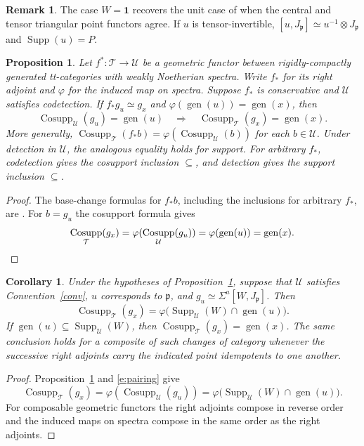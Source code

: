 \documentclass[11pt,reqno]{amsart}
\newtheorem{proposition}[theorem]{Proposition}
\newtheorem{corollary}[theorem]{Corollary}
\theoremstyle{definition}
\newtheorem{remark}[theorem]{Remark}
\DeclareMathOperator{\Cosupp}{Cosupp}
\DeclareMathOperator{\Supp}{Supp}
\DeclareMathOperator{\gen}{gen}
\newcommand{\T}{\mathcal T}
\newcommand{\U}{\mathcal U}
\newcommand{\one}{\mathbf 1}
\newcommand{\p}{\mathfrak p}
\numberwithin{equation}{section}
\begin{document}
\begin{remark}
The case $W=\one$ recovers the unit case of \cite[Proposition~5.4]{bik} when the central and tensor triangular point functors agree. If $u$ is tensor-invertible, $[u,J_{\p}]\simeq u^{-1}\otimes J_{\p}$ and $\Supp(u)=P$.
\end{remark}

\begin{proposition}\label{p:transport}
Let $f^*:\T\to\U$ be a geometric functor between rigidly-compactly generated tt-categories with weakly Noetherian spectra. Write $f_*$ for its right adjoint and $\varphi$ for the induced map on spectra. Suppose $f_*$ is conservative and $\U$ satisfies codetection. If $f_*g_u\simeq g_x$ and $\varphi(\gen(u))=\gen(x)$, then
\[
 \Cosupp_{\U}(g_u)=\gen(u)\quad\Longrightarrow\quad
 \Cosupp_{\T}(g_x)=\gen(x).
\]
More generally, $\Cosupp_{\T}(f_*b)=\varphi(\Cosupp_{\U}(b))$ for each $b\in\U$. Under detection in $\U$, the analogous equality holds for support. For arbitrary $f_*$, codetection gives the cosupport inclusion $\subseteq$, and detection gives the support inclusion $\subseteq$.
\end{proposition}
\begin{proof}
The base-change formulas for $f_*b$, including the inclusions for arbitrary $f_*$, are \cite[Proposition~14.2]{bchs}. For $b=g_u$ the cosupport formula gives
\[
 \Cosupp_{\T}(g_x)=\varphi(\Cosupp_{\U}(g_u))
                =\varphi(\gen(u))=\gen(x).\qedhere
\]
\end{proof}


\begin{corollary}\label{c:model}
Under the hypotheses of Proposition~\ref{p:transport}, suppose that $\U$ satisfies Convention~\ref{conv}, $u$ corresponds to $\p$, and $g_u\simeq\Sigma^a[W,J_{\p}]$. Then
\[
 \Cosupp_{\T}(g_x)
   =\varphi\big(\Supp_{\U}(W)\cap\gen(u)\big).
\]
If $\gen(u)\subseteq\Supp_{\U}(W)$, then $\Cosupp_{\T}(g_x)=\gen(x)$. The same conclusion holds for a composite of such changes of category whenever the successive right adjoints carry the indicated point idempotents to one another.
\end{corollary}
\begin{proof}
Proposition~\ref{p:transport} and \eqref{e:pairing} give
\[
 \Cosupp_{\T}(g_x)=\varphi(\Cosupp_{\U}(g_u))
 =\varphi\big(\Supp_{\U}(W)\cap\gen(u)\big).
\]
For composable geometric functors the right adjoints compose in reverse order and the induced maps on spectra compose in the same order as the right adjoints.
\end{proof}
\end{document}

